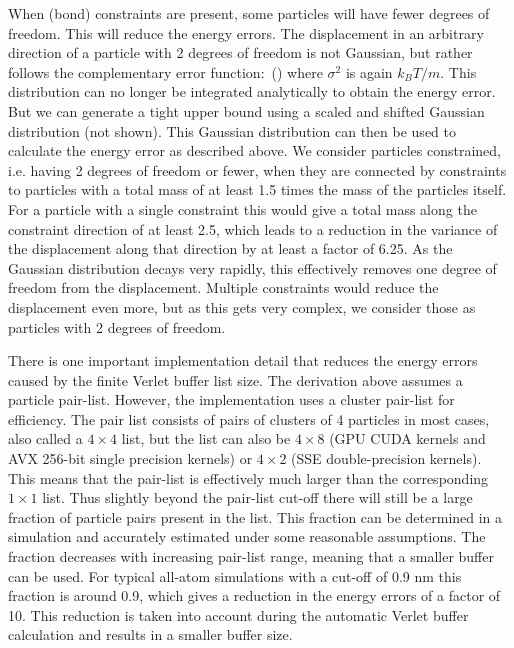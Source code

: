 {When (bond) constraints are present, some particles will have fewer
degrees of freedom. This will reduce the energy errors. The
displacement in an arbitrary direction of a particle with 2 degrees of
freedom is not Gaussian, but rather follows the complementary error
function: \beq
{}\,\left(\right)
\eeq where $\sigma^2$ is again $k_B T/m$.  This distribution can no
longer be integrated analytically to obtain the energy error. But we
can generate a tight upper bound using a scaled and shifted Gaussian
distribution (not shown). This Gaussian distribution can then be used
to calculate the energy error as described above. We consider
particles constrained, i.e. having 2 degrees of freedom or fewer, when
they are connected by constraints to particles with a total mass of at
least 1.5 times the mass of the particles itself. For a particle with
a single constraint this would give a total mass along the constraint
direction of at least 2.5, which leads to a reduction in the variance
of the displacement along that direction by at least a factor of 6.25.
As the Gaussian distribution decays very rapidly, this effectively
removes one degree of freedom from the displacement. Multiple
constraints would reduce the displacement even more, but as this gets
very complex, we consider those as particles with 2 degrees of
freedom.

There is one important implementation detail that reduces the energy
errors caused by the finite Verlet buffer list size. The derivation
above assumes a particle pair-list. However, the {\gromacs}
implementation uses a cluster pair-list for efficiency. The pair list
consists of pairs of clusters of 4 particles in most cases, also
called a $4 \times 4$ list, but the list can also be $4 \times 8$ (GPU
CUDA kernels and AVX 256-bit single precision kernels) or $4 \times 2$
(SSE double-precision kernels). This means that the pair-list is
effectively much larger than the corresponding $1 \times 1$ list. Thus
slightly beyond the pair-list cut-off there will still be a large
fraction of particle pairs present in the list. This fraction can be
determined in a simulation and accurately estimated under some
reasonable assumptions. The fraction decreases with increasing
pair-list range, meaning that a smaller buffer can be used. For
typical all-atom simulations with a cut-off of 0.9 nm this fraction is
around 0.9, which gives a reduction in the energy errors of a factor of
10. This reduction is taken into account during the automatic Verlet
buffer calculation and results in a smaller buffer size.

}
